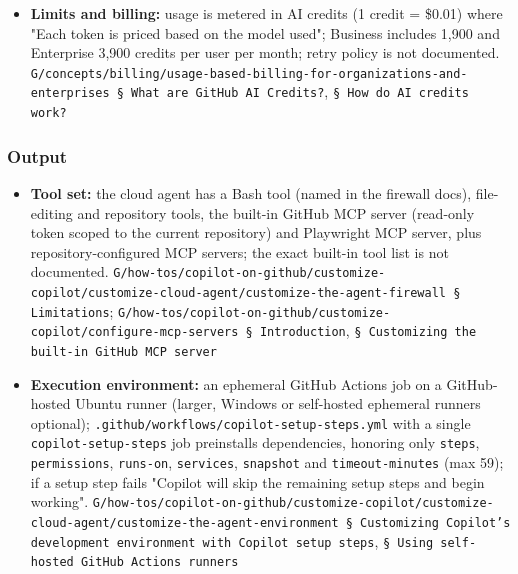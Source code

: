 \begin{itemize}
\item \textbf{Limits and billing:} usage is metered in AI credits (1 credit = \$0.01) where "Each token is priced based on the model used"; Business includes 1,900 and Enterprise 3,900 credits per user per month; retry policy is not documented. \texttt{G/\allowbreak{}concepts/\allowbreak{}billing/\allowbreak{}usage-\allowbreak{}based-\allowbreak{}billing-\allowbreak{}for-\allowbreak{}organizations-\allowbreak{}and-\allowbreak{}enterprises § What are GitHub AI Credits?}, \texttt{§ How do AI credits work?}
\end{itemize}

\subsubsection*{Output}
\begin{itemize}
\item \textbf{Tool set:} the cloud agent has a Bash tool (named in the firewall docs), file-editing and repository tools, the built-in GitHub MCP server (read-only token scoped to the current repository) and Playwright MCP server, plus repository-configured MCP servers; the exact built-in tool list is not documented. \texttt{G/\allowbreak{}how-\allowbreak{}tos/\allowbreak{}copilot-\allowbreak{}on-\allowbreak{}github/\allowbreak{}customize-\allowbreak{}copilot/\allowbreak{}customize-\allowbreak{}cloud-\allowbreak{}agent/\allowbreak{}customize-\allowbreak{}the-\allowbreak{}agent-\allowbreak{}firewall § Limitations}; \texttt{G/\allowbreak{}how-\allowbreak{}tos/\allowbreak{}copilot-\allowbreak{}on-\allowbreak{}github/\allowbreak{}customize-\allowbreak{}copilot/\allowbreak{}configure-\allowbreak{}mcp-\allowbreak{}servers § Introduction}, \texttt{§ Customizing the built-\allowbreak{}in GitHub MCP server}
\item \textbf{Execution environment:} an ephemeral GitHub Actions job on a GitHub-hosted Ubuntu runner (larger, Windows or self-hosted ephemeral runners optional); \texttt{.\allowbreak{}github/\allowbreak{}workflows/\allowbreak{}copilot-\allowbreak{}setup-\allowbreak{}steps.\allowbreak{}yml} with a single \texttt{copilot-\allowbreak{}setup-\allowbreak{}steps} job preinstalls dependencies, honoring only \texttt{steps}, \texttt{permissions}, \texttt{runs-\allowbreak{}on}, \texttt{services}, \texttt{snapshot} and \texttt{timeout-\allowbreak{}minutes} (max 59); if a setup step fails "Copilot will skip the remaining setup steps and begin working". \texttt{G/\allowbreak{}how-\allowbreak{}tos/\allowbreak{}copilot-\allowbreak{}on-\allowbreak{}github/\allowbreak{}customize-\allowbreak{}copilot/\allowbreak{}customize-\allowbreak{}cloud-\allowbreak{}agent/\allowbreak{}customize-\allowbreak{}the-\allowbreak{}agent-\allowbreak{}environment § Customizing Copilot's development environment with Copilot setup steps}, \texttt{§ Using self-\allowbreak{}hosted GitHub Actions runners}

\end{itemize}

